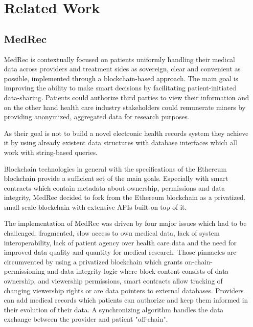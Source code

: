 \chapter{Related Work}
\label{cha:relatedwork}

\section{MedRec}

MedRec is contextually focused on patients uniformly handling their medical data across providers and treatment sides
as sovereign, clear and convenient as possible, implemented through a blockchain-based approach.
The main goal is improving the ability to make smart decisions by facilitating patient-initiated data-sharing.
Patients could authorize third parties to view their information and on the other hand health care industry stakeholders
could remunerate miners by providing anonymized, aggregated data for research purposes.

As their goal is not to build a novel electronic health records system they achieve it by using already existent data structures
with database interfaces which all work with string-based queries.

Blockchain technologies in general with the specifications of the Ethereum blockchain provide a sufficient set of the main goals.
Especially with smart contracts which contain metadata about ownership, permissions and data integrity, MedRec decided to fork
from the Ethereum blockchain as a privatized, small-scale blockchain with extensive APIs built on top of it.

The implementation of MedRec was driven by four major issues which had to be challenged: fragmented, slow access to own
medical data, lack of system interoperability, lack of patient agency over health care data and the need for improved
data quality and quantity for medical research.
Those pinnacles are circumvented by using a privatized blockchain which grants on-chain-permissioning and data integrity logic
where block content consists of data ownership, and viewership permissions, smart contracts allow tracking of changing
viewership rights or are data pointers to external databases.
Providers can add medical records which patients can authorize and keep them informed in their evolution of their data.
A synchronizing algorithm handles the data exchange between the provider and patient "off-chain".

